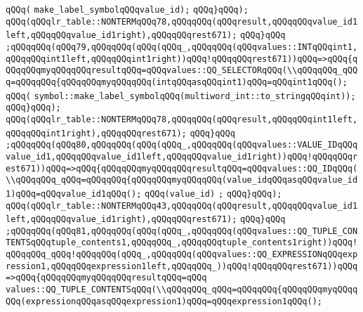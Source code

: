 \verb|qQQq(|\newline
\verb|make_label_symbolqQQqvalue_id);|\newline
\verb|qQQq}qQQq);|\newline
\verb|qQQq(qQQqlr_table::NONTERMqQQq78,qQQqqQQq(qQQqresult,qQQqqQQqvalue_id1left,qQQqqQQqvalue_id1right),qQQqqQQqrest671);|\newline
\verb|qQQq}qQQq|\newline
\verb|;qQQqqQQq(qQQq79,qQQqqQQq(qQQq(qQQq_,qQQqqQQq(qQQqvalues::INTqQQqint1,qQQqqQQqint1left,qQQqqQQqint1right))qQQq!qQQqqQQqrest671))qQQq=>qQQq{qQQqqQQqmyqQQqqQQqresultqQQq=qQQqvalues::QQ_SELECTORqQQq(\\qQQqqQQq_qQQq=qQQqqQQq{qQQqqQQqmyqQQqqQQq(intqQQqasqQQqint1)qQQq=qQQqint1qQQq();|\newline
\verb|qQQq(|\newline
\verb|symbol::make_label_symbolqQQq(multiword_int::to_stringqQQqint));|\newline
\verb|qQQq}qQQq);|\newline
\verb|qQQq(qQQqlr_table::NONTERMqQQq78,qQQqqQQq(qQQqresult,qQQqqQQqint1left,qQQqqQQqint1right),qQQqqQQqrest671);|\newline
\verb|qQQq}qQQq|\newline
\verb|;qQQqqQQq(qQQq80,qQQqqQQq(qQQq(qQQq_,qQQqqQQq(qQQqvalues::VALUE_IDqQQqvalue_id1,qQQqqQQqvalue_id1left,qQQqqQQqvalue_id1right))qQQq!qQQqqQQqrest671))qQQq=>qQQq{qQQqqQQqmyqQQqqQQqresultqQQq=qQQqvalues::QQ_IDqQQq(\\qQQqqQQq_qQQq=qQQqqQQq{qQQqqQQqmyqQQqqQQq(value_idqQQqasqQQqvalue_id1)qQQq=qQQqvalue_id1qQQq();|\newline
\verb|qQQq(value_id)|\newline
\verb|;|\newline
\verb|qQQq}qQQq);|\newline
\verb|qQQq(qQQqlr_table::NONTERMqQQq43,qQQqqQQq(qQQqresult,qQQqqQQqvalue_id1left,qQQqqQQqvalue_id1right),qQQqqQQqrest671);|\newline
\verb|qQQq}qQQq|\newline
\verb|;qQQqqQQq(qQQq81,qQQqqQQq(qQQq(qQQq_,qQQqqQQq(qQQqvalues::QQ_TUPLE_CONTENTSqQQqtuple_contents1,qQQqqQQq_,qQQqqQQqtuple_contents1right))qQQq!qQQqqQQq_qQQq!qQQqqQQq(qQQq_,qQQqqQQq(qQQqvalues::QQ_EXPRESSIONqQQqexpression1,qQQqqQQqexpression1left,qQQqqQQq_))qQQq!qQQqqQQqrest671))qQQq=>qQQq{qQQqqQQqmyqQQqqQQqresultqQQq=qQQq|\newline
\verb|values::QQ_TUPLE_CONTENTSqQQq(\\qQQqqQQq_qQQq=qQQqqQQq{qQQqqQQqmyqQQqqQQq(expressionqQQqasqQQqexpression1)qQQq=qQQqexpression1qQQq();|\newline
